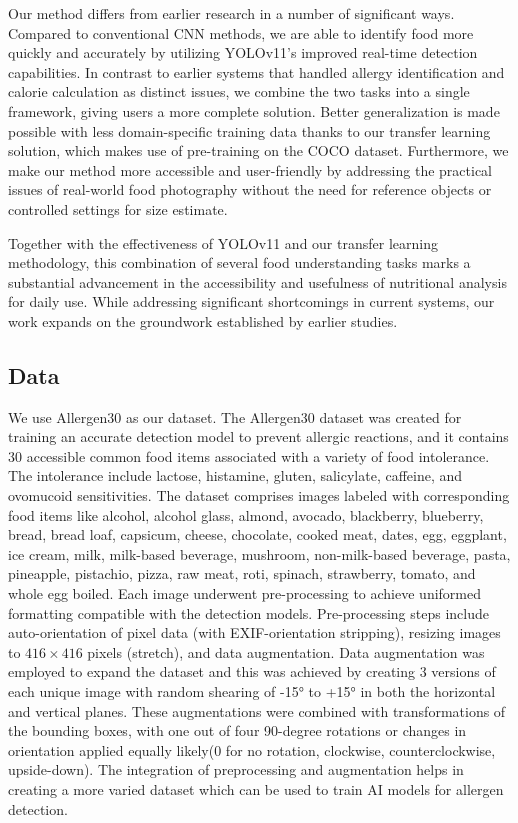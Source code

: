 \documentclass[10pt,twocolumn,letterpaper]{article}
\begin{document}
Our method differs from earlier research in a number of significant ways. Compared to conventional CNN methods, we are able to identify food more quickly and accurately by utilizing YOLOv11's\cite{redmon2016lookonceunifiedrealtime} improved real-time detection capabilities. 
In contrast to earlier systems that handled allergy identification and calorie calculation as distinct issues, we combine the two tasks into a single framework, giving users a more complete solution. 
Better generalization is made possible with less domain-specific training data thanks to our transfer learning solution, which makes use of pre-training on the COCO\cite{lin2015microsoftcococommonobjects} dataset. 
Furthermore, we make our method more accessible and user-friendly by addressing the practical issues of real-world food photography without the need for reference objects or controlled settings for size estimate.

Together with the effectiveness of YOLOv11 and our transfer learning methodology, this combination of several food understanding tasks marks a substantial advancement in the accessibility and usefulness of nutritional analysis for daily use. 
While addressing significant shortcomings in current systems, our work expands on the groundwork established by earlier studies.

\subsection{Data}

We use Allergen30 as our dataset. The Allergen30 dataset was created for training an accurate detection model to prevent allergic reactions, and it contains 30 accessible common food items associated with a variety of food intolerance. 
The intolerance include lactose, histamine, gluten, salicylate, caffeine, and ovomucoid sensitivities. The dataset comprises images labeled with corresponding food items like alcohol, alcohol glass, almond, avocado, blackberry, blueberry, bread, bread loaf, capsicum, cheese, chocolate, cooked meat, dates, egg, eggplant, ice cream, milk, milk-based beverage, mushroom, non-milk-based beverage, pasta, pineapple, pistachio, pizza, raw meat, roti, spinach, strawberry, tomato, and whole egg boiled. 
Each image underwent pre-processing to achieve uniformed formatting compatible with the detection models. 
Pre-processing steps include auto-orientation of pixel data (with EXIF-orientation stripping), resizing images to $416 \times 416$ pixels (stretch), and data augmentation. Data augmentation was employed to expand the dataset and this was achieved by creating 3 versions of each unique image with random shearing of -15° to +15° in both the horizontal and vertical planes. 
These augmentations were combined with transformations of the bounding boxes, with one out of four 90-degree rotations or changes in orientation applied equally likely(0 for no rotation, clockwise, counterclockwise, upside-down). 
The integration of preprocessing and augmentation helps in creating a more varied dataset which can be used to train AI models for allergen detection.
\end{document}
